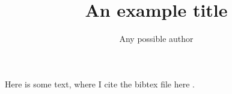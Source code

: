 \documentclass{article}
\title{An example title}
\author{Any possible author}
\begin{document}
\maketitle

Here is some text, where I cite the bibtex file here \cite{test_article}.



\end{document}

